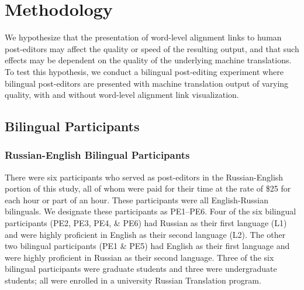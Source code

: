\vspace{-1.5mm}
\section{Methodology}
\label{sec:methodology}
\vspace{-1.5mm}
We hypothesize that the presentation of word-level alignment links to human post-editors may affect the quality or speed of the resulting output, and that such effects may be dependent on the quality of the underlying machine translations.
%
To test this hypothesis, we conduct a bilingual post-editing experiment where bilingual post-editors are presented with machine translation output of varying quality, with and without word-level alignment link visualization. 





\subsection{Bilingual Participants}


\subsubsection{Russian-English Bilingual Participants}
There were six participants who served as post-editors in the Russian-English portion of this study, all of whom were paid for their time at the rate of \$25 for each hour or part of an hour.
%
These participants were all English-Russian bilinguals.
%
We designate these participants as PE1--PE6.
%
Four of the six bilingual participants (PE2, PE3, PE4, \& PE6) had Russian as their first language (L1) and were highly proficient in English as their second language (L2).
%
The other two bilingual participants (PE1 \& PE5) had English as their first language and were highly proficient in Russian as their second language.
%
Three of the six bilingual participants were graduate students and three were undergraduate students; all were enrolled in a university Russian Translation program. %

%

